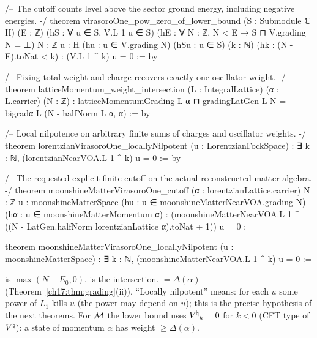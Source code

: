 \begin{leancode}
/-- The cutoff counts level above the sector ground energy, including negative energies. -/
theorem virasoroOne_pow_zero_of_lower_bound (S : Submodule ℂ H) (E : ℤ)
    (hS : ∀ u ∈ S, V.L 1 u ∈ S)
    (hE : ∀ N : ℤ, N < E → S ⊓ V.grading N = ⊥)
    {N : ℤ} {u : H} (hu : u ∈ V.grading N) (hSu : u ∈ S)
    (k : ℕ) (hk : (N - E).toNat < k) : (V.L 1 ^ k) u = 0 := by

/-- Fixing total weight and charge recovers exactly one oscillator weight. -/
theorem latticeMomentum_weight_intersection (L : IntegralLattice) (α : L.carrier) (N : ℤ) :
    latticeMomentumGrading L α ⊓ gradingLatGen L N =
      bigradα L (N - halfNorm L α, α) := by

/-- Local nilpotence on arbitrary finite sums of charges and oscillator weights. -/
theorem lorentzianVirasoroOne_locallyNilpotent (u : LorentzianFockSpace) :
    ∃ k : ℕ, (lorentzianNearVOA.L 1 ^ k) u = 0 := by

/-- The requested explicit finite cutoff on the actual reconstructed matter algebra. -/
theorem moonshineMatterVirasoroOne_cutoff (α : lorentzianLattice.carrier)
    {N : ℤ} {u : moonshineMatterSpace} (hu : u ∈ moonshineMatterNearVOA.grading N)
    (hα : u ∈ moonshineMatterMomentum α) :
    (moonshineMatterNearVOA.L 1 ^ ((N - LatGen.halfNorm lorentzianLattice α).toNat + 1)) u = 0 :=

theorem moonshineMatterVirasoroOne_locallyNilpotent (u : moonshineMatterSpace) :
    ∃ k : ℕ, (moonshineMatterNearVOA.L 1 ^ k) u = 0 :=
\end{leancode}

\begin{dictionary}
 is $\max(N-E_0,0)$.   is the intersection.   $=\Delta(\alpha)$
(Theorem~\ref{ch17:thm:grading}(ii)).  ``Locally nilpotent'' means: for each $u$ some power of $L_1$ kills $u$ (the power
may depend on $u$); this is the precise hypothesis  of the next theorems.  For $\mathcal{M}$ the lower bound
uses ${V^{\natural}}_k=0$ for $k<0$ (CFT type of ${V^{\natural}}$): a state of momentum $\alpha$ has weight $\ge \Delta(\alpha)$.
\end{dictionary}

